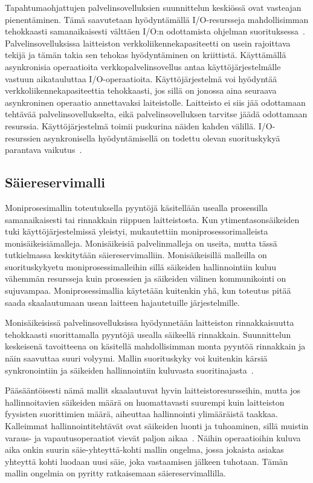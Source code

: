 \documentclass[finnish]{tktltiki2}
\theoremstyle{definition}
\theoremstyle{remark}
\begin{document}
Tapahtumaohjattujen palvelinsovelluksien suunnittelun keskiössä
ovat vasteajan pienentäminen.
Tämä saavutetaan hyödyntämällä I/O-resursseja mahdollisimman tehokkaasti
samanaikaisesti välttäen I/O:n odottamista ohjelman suorituksessa~\cite{pai_flash:_1999}.
Palvelinsovelluksissa
laitteiston verkkoliikennekapasiteetti on usein rajoittava tekijä ja tämän takia
sen tehokas hyödyntäminen on kriittistä.
Käyttämällä asynkronisia operaatioita verkkopalvelinsovellus
antaa käyttöjärjestelmälle vastuun aikatauluttaa I/O-operaatioita.
Käyttöjärjestelmä voi hyödyntää verkkoliikennekapasiteettia
tehokkaasti, jos sillä on jonossa aina seuraava asynkroninen operaatio
annettavaksi laiteistolle. Laitteisto ei siis jää odottamaan tehtävää
palvelinsovellukselta, eikä palvelinsovelluksen tarvitse jäädä
odottamaan resurssia. Käyttöjärjestelmä toimii
puskurina näiden kahden välillä.
I/O-resurssien asynkronisella hyödyntämisellä on todettu
olevan suorituskykyä parantava vaikutus~\cite{hu_applying_1998}.


\subsection{Säiereservimalli}
Moniprosesimallin toteutuksella pyyntöjä käsitellään
usealla prosessilla samanaikaisesti tai rinnakkain riippuen laitteistosta.
Kun ytimentasonsäikeiden tuki käyttöjärjestelmissä yleistyi, mukautettiin
moniprosessorimalleista monisäikeisiämalleja.
Monisäikeisiä palvelinmalleja on useita, mutta tässä tutkielmassa keskitytään säiereservimalliin.
Monisäikeisillä malleilla on suorituskykyetu moniprosessimalleihin sillä säikeiden
hallinnointiin
kuluu vähemmän resursseja kuin prosessien ja säikeiden välinen kommunikointi on sujuvampaa.
Moniprosessimallia käytetään kuitenkin yhä, kun toteutus pitää
saada skaalautumaan usean laitteen hajautetuille järjestelmille.

Monisäikeisissä palvelinsovelluksissa hyödynnetään laitteiston
rinnakkaisuutta tehokkaasti suorittamalla pyyntöjä usealla säikeellä rinnakkain.
Suunnittelun keskeisenä tavoitteena on käsitellä mahdollisimman monta pyyntöä rinnakkain ja
näin saavuttaa suuri volyymi. Mallin suorituskyky voi kuitenkin
kärsiä synkronointiin ja säikeiden hallinnointiin kuluvasta
suoritinajasta~\cite{pyarali_proactor_1997}.

Pääsääntöisesti nämä mallit skaalautuvat hyvin laitteistoresursseihin,
mutta jos hallinnoitavien säikeiden määrä on huomattavasti suurempi kuin laitteiston
fyysisten suorittimien määrä, aiheuttaa hallinnointi ylimääräistä taakkaa.
Kalleimmat hallinnointitehtävät ovat säikeiden luonti ja tuhoaminen, sillä
muistin varaus- ja vapautusoperaatiot vievät paljon aikaa~\cite{ling_analysis_2000}.
Näihin operaatioihin kuluva aika onkin suurin säie-yhteyttä-kohti mallin
ongelma, jossa jokaista asiakas yhteyttä kohti
luodaan uusi säie, joka vastaamisen jälkeen tuhotaan.
Tämän mallin ongelmia on pyritty ratkaisemaan säiereservimallilla.
\end{document}
